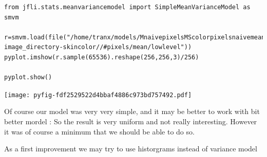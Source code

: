 \documentclass{report}
\begin{document}
\begin{lstlisting}
from jfli.stats.meanvariancemodel import SimpleMeanVarianceModel as smvm

r=smvm.load(file("/home/tranx/models/MnaivepixelsMScolorpixelsnaivemeanLmeanvariancemodelSimpleMeanVarianceModel-image_directory-skincolor//#pixels/mean/lowlevel"))
pyplot.imshow(r.sample(65536).reshape(256,256,3)/256)

pyplot.show()

\end{lstlisting}















\noindent
\texttt{[image: pyfig-fdf2529522d4bbaf4886c973bd757492.pdf]}




Of course our model was very very simple, and it may be better to work with bit better mordel :
So the result is very uniform and not really interesting. However it was of course a minimum that we 
should be able to do so.



As a first improvement we may try to use historgrams instead of variance model
\end{document}
